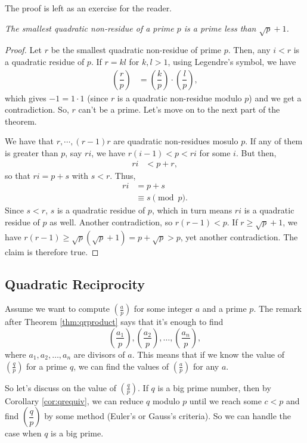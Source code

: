 \documentclass[main.tex]{subfile}
\begin{document}
The proof is left as an exercise for the reader.
		\begin{theorem}\slshape
			The smallest quadratic non-residue of a prime $p$ is a prime less than $\sqrt{p}+1$.
		\end{theorem}
		
		\begin{proof}
			Let $r$ be the smallest quadratic non-residue of prime $p$. Then, any $i<r$ is a quadratic residue of $p$. If $r=kl$ for $k,l>1$, using Legendre's symbol, we have
			\begin{align*}
				\left(\dfrac{r}{p}\right) & = \left(\dfrac{k}{p}\right)\cdot\left(\dfrac{l}{p}\right),
			\end{align*}
			which gives $-1=1\cdot 1$ (since $r$ is a quadratic non-residue modulo $p$) and we get a contradiction. So, $r$ can't be a prime. Let's move on to the next part of the theorem.
			
			We have that $r,\cdots,(r-1)r$ are quadratic non-residues mosulo $p$. If any of them is greater than $p$, say $ri$, we have $r(i-1)<p<ri$ for some $i$. But then,
			\begin{align*}
				ri & < p+r,
			\end{align*}
			so that $ri=p+s$ with $s<r$. Thus,
			\begin{align*}
				ri & = p+s\\
				& \equiv s\pmod p.
			\end{align*}
			Since $s<r$, $s$ is a quadratic residue of $p$, which in turn means $ri$ is a quadratic residue of $p$ as well. Another contradiction, so $r(r-1)<p$. If $r\geq\sqrt{p}+1$, we have $r(r-1)\geq\sqrt{p}(\sqrt{p}+1)=p+\sqrt{p}>p$, yet another contradiction. The claim is therefore true.
		\end{proof}
	
	\subsection{Quadratic Reciprocity}
	Assume we want to compute $ \left(\frac{a}{p}\right)$ for some integer $a$ and a prime $p$. The remark after Theorem \ref{thm:qrproduct} says that it's enough to find $$ \left(\dfrac{a_1}{p}\right), \left(\dfrac{a_2}{p}\right), \ldots, \left(\dfrac{a_n}{p}\right),$$ where $a_1,a_2,\ldots,a_n$ are divisors of $a$. This means that if we know the value of $\left(\frac{q}{p}\right)$ for a prime $q$, we can find the values of $\left(\frac{a}{p}\right)$ for any $a$.
	
	So let's discuss on the value of $\left(\frac{q}{p}\right)$. If $q$ is a big prime number, then by Corollary \ref{cor:qrequiv}, we can reduce $q$ modulo $p$ until we reach some $c<p$ and find $\left(\dfrac{q}{p}\right)$ by some method (Euler's or Gauss's criteria). So we can handle the case when $q$ is a big prime.
	
\end{document}
